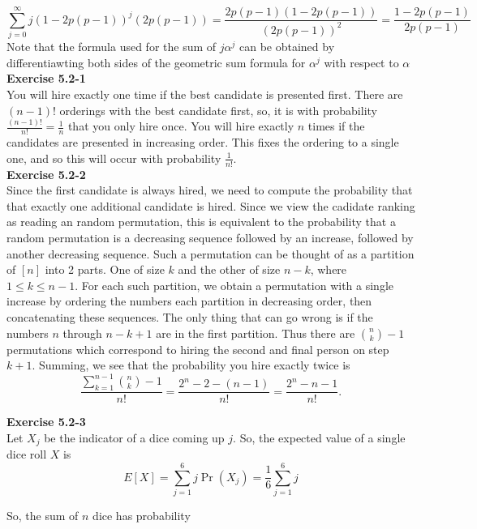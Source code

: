 \documentclass{article}
\begin{document}
\[
\sum_{j=0}^{\infty} j (1 - 2 p(p-1))^j ( 2 p (p-1)) = \frac{2p(p-1) (1 - 2p(p-1))}{( 2p(p-1))^2} = \frac{1 - 2p(p-1)}{2p(p-1)}
\]
Note that the formula used for the sum of $j\alpha^j$ can be obtained by differentiawting both sides of the geometric sum formula for $\alpha^j$ with respect to $\alpha$\\


\noindent\textbf{Exercise 5.2-1}\\

You will hire exactly one time if the best candidate is presented first. There are $(n-1)!$ orderings with the best candidate first, so, it is with probability $\frac{(n-1)!}{n!} = \frac{1}{n}$ that you only hire once.
You will hire exactly $n$ times if the candidates are presented in increasing order. This fixes the ordering to a single one, and so this will occur with probability $\frac{1}{n!}$.\\

\noindent\textbf{Exercise 5.2-2}\\

Since the first candidate is always hired, we need to compute the probability that that exactly one additional candidate is hired.  Since we view the cadidate ranking as reading an random permutation, this is equivalent to the probability that a random permutation is a decreasing sequence followed by an increase, followed by another decreasing sequence.  Such a permutation can be thought of as a partition of $[n]$ into 2 parts.  One of size $k$ and the other of size $n-k$, where $1 \leq k \leq n-1$.  For each such partition, we obtain a permutation with a single increase by ordering the numbers each partition in decreasing order, then concatenating these sequences.  The only thing that can go wrong is if the numbers $n$ through $n - k + 1$ are in the first partition.  Thus there are ${n \choose k} - 1$ permutations which correspond to hiring the second and final person on step $k+1$.  Summing, we see that the probability you hire exactly twice is
\[ \frac{\sum_{k=1}^{n-1} {n \choose k} - 1}{n!} = \frac{2^n - 2 - (n-1)}{n!} = \frac{2^n - n - 1}{n!}.\]

\noindent\textbf{Exercise 5.2-3}\\

Let $X_j$ be the indicator of a dice coming up $j$. So, the expected value of a single dice roll $X$ is 
\[
E[X] = \sum_{j=1}^{6} j \Pr(X_j) = \frac{1}{6} \sum_{j=1}^6 j 
\]

So, the sum of $n$ dice has probability
\end{document}

